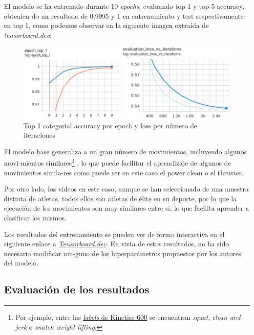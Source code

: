 El modelo se ha entrenado durante 10 \textit{epochs}, evaluando top 1 y top 5 accuracy, obtenien-do un resultado de 0.9995 y 1 en entrenamiento y test respectivamente en top 1, como podemos observar en la siguiente imagen extraída de \textit{tensorboard.dev}:

\begin{figure}[H]
    \centering
		\includegraphics[width=\textwidth]{figs/tensorboard_training.png}
\caption{Top 1 categorial accuracy por epoch y loss por número de iteraciones}\label{training}
\end{figure}

El modelo base generaliza a un gran número de movimientos, incluyendo algunos movi-mientos similares\footnote{Por ejemplo, entre las  \href{https://raw.githubusercontent.com/tensorflow/models/f8af2291cced43fc9f1d9b41ddbf772ae7b0d7d2/official/projects/movinet/files/kinetics_600_labels.txt}{\textit{labels} de Kinetics 600} se encuentran \textit{squat}, \textit{clean and jerk} o \textit{snatch weight lifting}.} , lo que puede facilitar el aprendizaje de algunos de movimientos simila-res como puede ser en este caso el power clean o el thruster.

Por otro lado, los videos en este caso, aunque se han seleccionado de una muestra distinta de atletas, todos ellos son atletas de élite en su deporte, por lo que la ejecución de los movimientos son muy similares entre si, lo que facilita aprender a clasificar los mismos.

Los resultados del entrenamiento se pueden ver de forma interactiva en el siguiente enlace a \href{https://tensorboard.dev/experiment/UXyupsnMQ2S74vdul3vdbw/#scalars}{\textit{Tensorboard.dev}}. En vista de estos resultados, no ha sido necesario modificar nin-guno de los hiperparámetros propuestos por los autores del modelo.


\subsection{Evaluación de los resultados}


